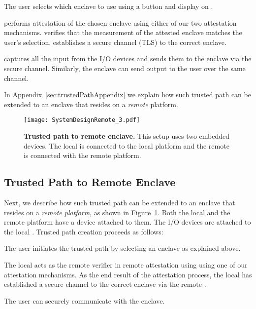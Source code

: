 \begin{mylist}
    \item[\one] The user selects which enclave to use using a button and display on \device.
    \item[\two] \device performs attestation of the chosen enclave using either of our two attestation mechanisms. \device verifies that the measurement of the attested enclave matches the user's selection. \device establishes a secure channel (TLS) to the correct enclave.
    \item[\three] \device captures all the input from the I/O devices and sends them to the enclave via the secure channel. Similarly, the enclave can send output to the user over the same channel.
\end{mylist}

In Appendix~\ref{sec:trustedPathAppendix} we explain how such trusted path can be extended to an enclave that resides on a \emph{remote} platform. 


\iffalse

\begin{figure}[t]
 \centering
  \texttt{[image: SystemDesignRemote\_3.pdf]}
 \caption{\textbf{Trusted path to remote enclave.} This setup uses two embedded devices. The local \device is connected to the local platform and the remote \device is connected with the remote platform.}
	\figsaver
 \label{fig:systemRemoteHost}
\end{figure}

\subsection{Trusted Path to Remote Enclave} 

Next, we describe how such trusted path can be extended to an enclave that resides on a \emph{remote platform}, as shown in Figure~\ref{fig:systemRemoteHost}. Both the local and the remote platform have a \device device attached to them. The I/O devices are attached to the local \device. Trusted path creation proceeds as follows:

\begin{mylist}
	\item[\one] The user initiates the trusted path by selecting an enclave as explained above.
	\item[\two] The local \device acts as the remote verifier in remote attestation using using one of our attestation mechanisms. As the end result of the attestation process, the local \device has established a secure channel to the correct enclave via the remote \device.
	\item[\three] The user can securely communicate with the enclave.
\end{mylist}

